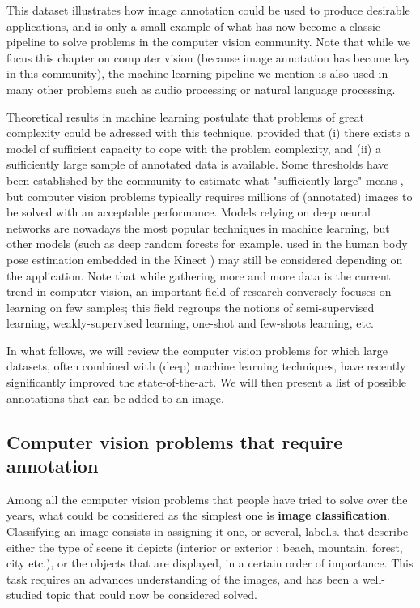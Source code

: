 This dataset illustrates how image annotation could be used to produce desirable applications, and is only a small example of what has now become a classic pipeline to solve problems in the computer vision community. Note that while we focus this chapter on computer vision (because image annotation has become key in this community), the machine learning pipeline we mention is also used in many other problems such as audio processing or natural language processing. 

Theoretical results in machine learning postulate that problems of great complexity could be adressed with this technique, provided that (i) there exists a model of sufficient capacity to cope with the problem complexity, and (ii) a sufficiently large sample of annotated data is available. Some thresholds have been established by the community to estimate what "sufficiently large" means \cite{blabla}, but computer vision problems typically requires millions of (annotated) images to be solved with an acceptable performance. Models relying on deep neural networks are nowadays the most popular techniques in machine learning, but other models (such as deep random forests for example, used in the human body pose estimation embedded in the Kinect \cite{blabla}) may still be considered depending on the application. Note that while gathering more and more data is the current trend in computer vision, an important field of research conversely focuses on learning on few samples; this field regroups the notions of semi-supervised learning, weakly-supervised learning, one-shot and few-shots learning, etc. 

In what follows, we will review the computer vision problems for which large datasets, often combined with (deep) machine learning techniques, have recently significantly improved the state-of-the-art. We will then present a list of possible annotations that can be added to an image. 

\subsection*{Computer vision problems that require annotation}
  
Among all the computer vision problems that people have tried to solve over the years, what could be considered as the simplest one is \textbf{image classification}. Classifying an image consists in assigning it one, or several, label.s. that describe either the type of scene it depicts (interior or exterior ; beach, mountain, forest, city etc.), or the objects that are displayed, in a certain order of importance. This task requires an advances understanding of the images, and has been a well-studied topic that could now be considered solved. 

